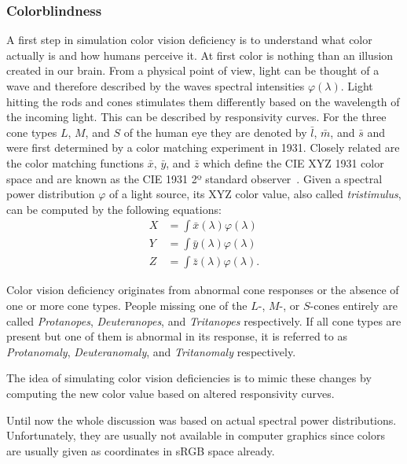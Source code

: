 \documentclass{sig-alternate-05-2015}
\begin{document}
\subsubsection{Colorblindness}
\label{sec:colorblindness}
A first step in simulation color vision deficiency is to understand what color actually is and how humans perceive it.
At first color is nothing than an illusion created in our brain.
From a physical point of view, light can be thought of a wave and therefore described by the waves spectral intensities $\varphi(\lambda)$.
Light hitting the rods and cones stimulates them differently based on the wavelength of the incoming light.
This can be described by responsivity curves.
For the three cone types $L$, $M$, and $S$ of the human eye they are denoted by $\bar l$, $\bar m$, and $\bar s$ and were first determined by a color matching experiment in 1931.
Closely related are the color matching functions $\bar x$, $\bar y$, and $\bar z$ which define the CIE XYZ 1931 color space and are known as the CIE 1931 2º standard observer~\cite{cvrl-xyz-web}.
Given a spectral power distribution $\varphi$ of a light source, its XYZ color value, also called \emph{tristimulus}, can be computed by the following equations:
\begin{eqnarray}
    \label{eqn:xyzdef}
    X &= \int\bar x(\lambda) \varphi(\lambda) \\
    Y &= \int\bar y(\lambda) \varphi(\lambda) \\
    Z &= \int\bar z(\lambda) \varphi(\lambda).
\end{eqnarray}

Color vision deficiency originates from abnormal cone responses or the absence of one or more cone types.
People missing one of the $L$-, $M$-, or $S$-cones entirely are called \emph{Protanopes}, \emph{Deuteranopes}, and \emph{Tritanopes} respectively.
If all cone types are present but one of them is abnormal in its response, it is referred to as \emph{Protanomaly}, \emph{Deuteranomaly}, and \emph{Tritanomaly} respectively.

The idea of simulating color vision deficiencies is to mimic these changes by computing the new color value based on altered responsivity curves.

Until now the whole discussion was based on actual spectral power distributions.
Unfortunately, they are usually not available in computer graphics since colors are usually given as coordinates in sRGB space already.
\end{document}
